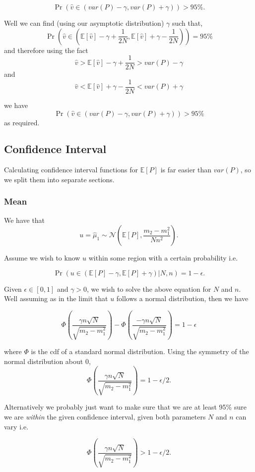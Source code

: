 \documentclass[
10pt, %
a4paper, %
oneside, %
headinclude,footinclude, %
BCOR5mm, %
]{scrartcl}
\begin{document}
$$ \Pr(\hat{v} \in (var(P) - \gamma, var(P) + \gamma)) > 95\%. $$

Well we can find (using our asymptotic distribution) $\gamma$ such that,
$$ \Pr(\hat{v} \in (\mathbb{E}[\hat{v}] - \gamma +\frac{1}{2N}, \mathbb{E}[\hat{v}] + \gamma - \frac{1}{2N})) = 95\% $$
and therefore using the fact
$$ \hat{v} > \mathbb{E}[\hat{v}] - \gamma + \frac{1}{2N} > var(P) - \gamma $$
and
$$ \hat{v} < \mathbb{E}[\hat{v}] + \gamma - \frac{1}{2N} < var(P) + \gamma $$

we have
$$ \Pr(\hat{v} \in (var(P) - \gamma, var(P) + \gamma)) > 95\% $$
as required.

\subsection{Confidence Interval}
Calculating confidence interval functions for $\mathbb{E}[P]$ is far easier than $var(P)$, so we split them into separate sections.

\subsubsection{Mean}
We have that
$$ u = \hat{\mu}_1 \sim \mathcal{N} \left( \mathbb{E}[P], \frac{m_2 - m_1^2}{Nn^2} \right ).$$

Assume we wish to know $u$ within some region with a certain probability i.e.

$$ \Pr (u \in (\mathbb{E}[P] - \gamma, \mathbb{E}[P] + \gamma)|N, n ) = 1 - \epsilon. $$

Given $\epsilon \in [0,1]$ and $\gamma > 0$, we wish to solve the above equation for $N$ and $n$. Well assuming as in the limit that $u$ follows a normal distribution, then we have

$$ \Phi \left (\frac{\gamma n \sqrt{N}}{\sqrt{m_2 - m_1^2}} \right ) - \Phi \left ( \frac{-\gamma n \sqrt{N}}{\sqrt{m_2 - m_1^2}} \right ) = 1 - \epsilon $$

where $\Phi$ is the cdf of a standard normal distribution. Using the symmetry of the normal distribution about $0$,
$$ \Phi \left (\frac{\gamma n \sqrt{N}}{\sqrt{m_2 - m_1^2}} \right ) = 1 - \epsilon/2. $$

Alternatively we probably just want to make sure that we are at least 95\% sure we are \textit{within} the given confidence interval, given both parameters $N$ and $n$ can vary i.e.

\begin{equation} \label{eqn.mean_dist} 
\Phi \left (\frac{\gamma n \sqrt{N}}{\sqrt{m_2 - m_1^2}} \right ) > 1 - \epsilon/2.
\end{equation} \label{eqn.mean_dist}
\end{document}
